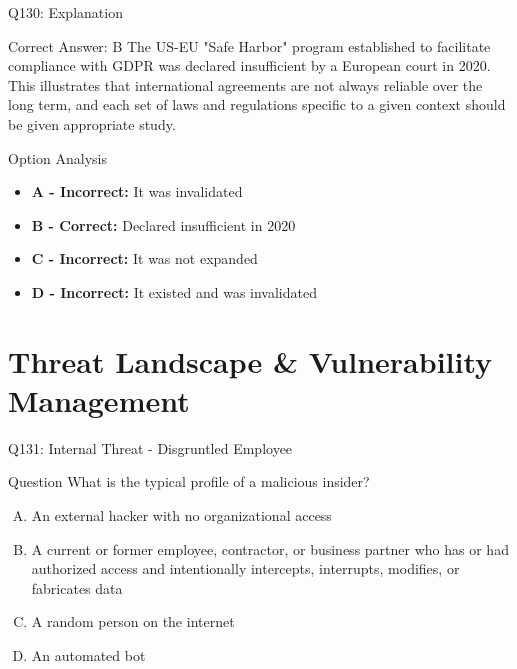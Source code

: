 \documentclass{beamer}
\begin{document}
	\begin{frame}{Q130: Explanation}
		\begin{block}{Correct Answer: B}
			The US-EU "Safe Harbor" program established to facilitate compliance with GDPR was declared insufficient by a European court in 2020. This illustrates that international agreements are not always reliable over the long term, and each set of laws and regulations specific to a given context should be given appropriate study.
		\end{block}
		\begin{block}{Option Analysis}
			\begin{itemize}
				\item \textbf{A - Incorrect:} It was invalidated
				\item \textbf{B - Correct:} Declared insufficient in 2020
				\item \textbf{C - Incorrect:} It was not expanded
				\item \textbf{D - Incorrect:} It existed and was invalidated
			\end{itemize}
		\end{block}
	\end{frame}
	
	
	\section{Threat Landscape \& Vulnerability Management}
	
	\begin{frame}{Q131: Internal Threat - Disgruntled Employee}
		\begin{block}{Question}
			What is the typical profile of a malicious insider?
		\end{block}
		\begin{enumerate}[(A)]
			\item An external hacker with no organizational access
			\item A current or former employee, contractor, or business partner who has or had authorized access and intentionally intercepts, interrupts, modifies, or fabricates data
			\item A random person on the internet
			\item An automated bot
		\end{enumerate}
	\end{frame}
	
\end{document}
